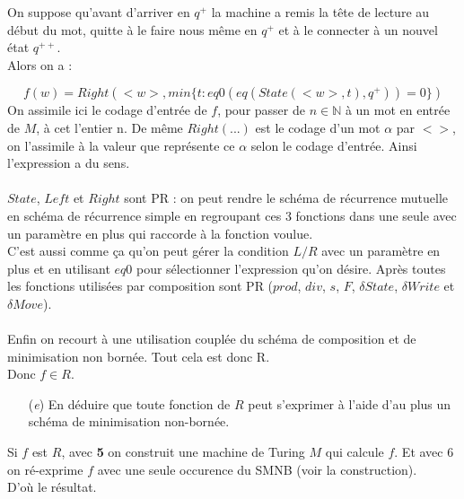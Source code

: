 \documentclass[12pt,letterpaper,boxed]{hmcpset}
\begin{document}
\begin{solution}[e)]
On suppose qu'avant d'arriver en $q^{+}$ la machine a remis la tête de lecture au début du mot, quitte à le faire nous même en $q^{+}$ et à le connecter à un nouvel état $q^{++}$. \\
Alors on a  : 

$$ f(w) =  Right(<w>, min \{t : eq0(eq(State(<w>,t), q^{+})) = 0 \}) $$
\noindent On assimile ici le codage d'entrée de $f$, pour passer de $n \in \mathbb{N}$ à un mot en entrée de $M$, à cet l'entier n. De même $Right(...)$ est le codage d'un mot $\alpha$ par $<>$, on l'assimile à la valeur que représente ce $\alpha$ selon le codage d'entrée. Ainsi l'expression a du sens. \\ \\
$State$, $Left$ et $Right$ sont PR : on peut rendre le schéma de récurrence mutuelle en schéma de récurrence simple en regroupant ces 3 fonctions dans une seule avec un paramètre en plus qui raccorde à la fonction voulue. \\ C'est aussi comme ça qu'on peut gérer la condition $L/R$ avec un paramètre en plus et en utilisant $eq0$ pour sélectionner l'expression qu'on désire. Après toutes les fonctions utilisées par composition sont PR ($prod$, $div$, $s$, $F$, $\delta State$, $\delta Write$ et $\delta Move$). \\ \\
Enfin on recourt à une utilisation couplée du schéma de composition et de minimisation non bornée. Tout cela est donc R. \\
Donc $f \in R$.


\end{solution}

\begin{problem}[Question 7]
\begin{itemize}
  \item[(\textit{e})] 
En déduire que toute fonction de $R$ peut s'exprimer à l'aide d'au plus un schéma de minimisation non-bornée.
   \end{itemize}
\end{problem}

\begin{solution}
Si $f$ est $R$, avec \textbf{5} on construit une machine de Turing $M$ qui calcule $f$. Et avec $6$ on ré-exprime $f$ avec une seule occurence du SMNB (voir la construction). \\
D'où le résultat. \\
\end{solution}
\end{document}
